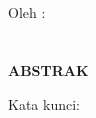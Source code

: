 \clearpage
{}
{}
\begin{center}
    \textbf{\large{\judulid}}\\[0.5cm]
    Oleh :\\
    \penulisPertama\\
    \nimPertama\\[2em]
    \textbf{ABSTRAK}\\[0.5cm]
\end{center}

\noindent Kata kunci: \katakunci
